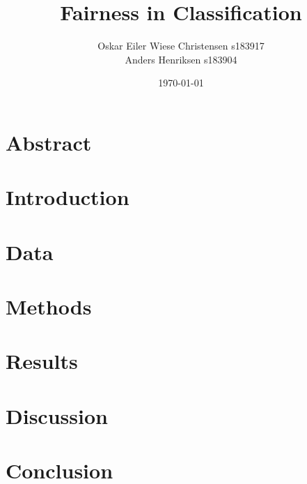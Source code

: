 \documentclass[11pt, fleqn, titlepage]{article}
\title{Fairness in Classification}
\author{Oskar Eiler Wiese Christensen s183917 \\ Anders Henriksen s183904}
\date{\today}
\begin{document}
	
	\maketitle
	\tableofcontents \newpage
	\section{Abstract}
	
	
	\section{Introduction}
	
	
	\section{Data}
	
	
	\section{Methods}
	 
	
	\section{Results}
	
	
	\section{Discussion}
	
	
	\section{Conclusion}
	
	
\end{document}
